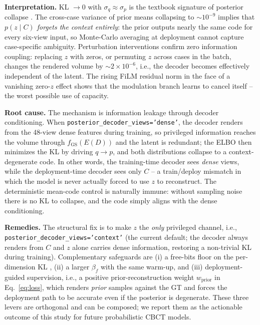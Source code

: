 \textbf{Interpretation.}
KL $\to 0$ with $\sigma_q\approx\sigma_p$ is the textbook signature of
posterior collapse \cite{bowman2016generating,lucas2019donot}. The
cross-case variance of prior means collapsing to $\sim 10^{-9}$ implies
that \emph{$p(z\mid C)$ forgets the context entirely}: the prior outputs
nearly the same code for every six-view input, so Monte-Carlo averaging
at deployment cannot capture case-specific ambiguity. Perturbation
interventions confirm zero information coupling: replacing $z$ with
zeros, or permuting $z$ across cases in the batch, changes the rendered
volume by ${\sim}2{\times}10^{-6}$, i.e., the decoder becomes effectively
independent of the latent. The rising FiLM residual norm in the face of
a vanishing zero-$z$ effect shows that the modulation branch learns to
cancel itself -- the worst possible use of capacity.

\textbf{Root cause.}
The mechanism is information leakage through decoder conditioning.
When \texttt{posterior\_decoder\_views='dense'}, the decoder renders
from the 48-view dense features during training, so privileged
information reaches the volume through $f_{\mathrm{GS}}(E(D))$ and the
latent is redundant; the ELBO then minimizes the KL by driving $q\to p$,
and both distributions collapse to a context-degenerate code. In other
words, the training-time decoder sees \emph{dense} views, while the
deployment-time decoder sees only $C$ -- a train/deploy mismatch in
which the model is never actually forced to use $z$ to reconstruct.
The deterministic mean-code control is naturally immune: without
sampling noise there is no KL to collapse, and the code simply aligns
with the dense conditioning.

\textbf{Remedies.}
The structural fix is to make $z$ the \emph{only} privileged channel,
i.e., \texttt{posterior\_decoder\_views='context'} (the current default;
the decoder always renders from $C$ and $z$ alone carries dense
information, restoring a non-trivial KL during training).
Complementary safeguards are (i) a free-bits floor on the per-dimension
KL \cite{kingma2016freebits}, (ii) a larger $\beta_f$ with the same
warm-up, and (iii) deployment-guided supervision, i.e., a positive
prior-reconstruction weight $w_{\mathrm{prior}}$ in
Eq.~\eqref{eq:loss}, which renders \emph{prior} samples against the GT
and forces the deployment path to be accurate even if the posterior is
degenerate. These three levers are orthogonal and can be composed; we
report them as the actionable outcome of this study for future
probabilistic CBCT models.

